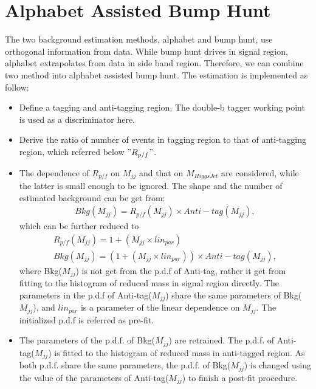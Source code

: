 \section{Alphabet Assisted Bump Hunt}
The two background estimation methods, alphabet and bump hunt, use orthogonal information from data.
While bump hunt drives in signal region, alphabet extrapolates from data in side band region. 
Therefore, we can combine two method into alphabet assisted bump hunt. The estimation is implemented as follow:
\begin{itemize}
\item Define a tagging and anti-tagging region. The double-b tagger working point is used as a discriminator here.
\item Derive the ratio of number of events in tagging region to that of anti-tagging region, which referred below $" R_{p/f} "$.
\item The dependence of $R_{p/f}$ on $M_{jj}$ and that on $M_{Higgs Jet}$ are considered, while the latter is small enough to be ignored. The shape and the number of estimated background can be get from:
\begin{equation} 
\begin{split}
Bkg(M_{jj})= R_{p/f}(M_{jj}) \times Anti-tag(M_{jj}), 
\end{split}
\end{equation}
which can be further reduced to 
\begin{equation} 
\begin{split}
R_{p/f}(M_{jj})= 1+(M_{jj} \times lin_{par}) \\
Bkg(M_{jj})= (1+(M_{jj} \times lin_{par})) \times Anti-tag(M_{jj}),
\end{split}
\end{equation}
where Bkg($M_{jj}$) is not get from the p.d.f of Anti-tag, rather it get from fitting to the histogram of reduced mass in signal region directly.
The parameters in the p.d.f of Anti-tag($M_{jj}$) share the same parameters of Bkg($M_{jj}$), and $lin_{par}$ is a parameter of the linear dependence on $M_{jj}$. The initialized p.d.f is referred as pre-fit.
\item  The parameters of the p.d.f. of Bkg($M_{jj}$) are retrained. The p.d.f. of Anti-tag($M_{jj}$) is fitted to the histogram of reduced mass in anti-tagged region. As both p.d.f. share the same parameters, the p.d.f. of Bkg($M_{jj}$) is changed using the value of the parameters of Anti-tag($M_{jj}$) to finish a post-fit procedure. 

\end{itemize}
